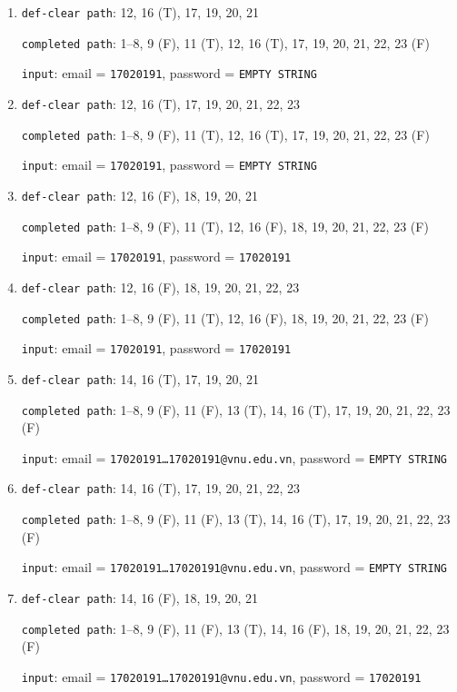 \documentclass{article}
\begin{document}
\begin{enumerate}
    \item \texttt{def-clear path}: 12, 16 (T), 17, 19, 20, 21
          \par \texttt{completed path}: 1--8, 9 (F), 11 (T), 12, 16 (T), 17, 19, 20, 21, 22, 23 (F)
          \par \texttt{input}: email = \texttt{17020191}, password = \texttt{EMPTY STRING}

    \item \texttt{def-clear path}: 12, 16 (T), 17, 19, 20, 21, 22, 23
          \par \texttt{completed path}: 1--8, 9 (F), 11 (T), 12, 16 (T), 17, 19, 20, 21, 22, 23 (F)
          \par \texttt{input}: email = \texttt{17020191}, password = \texttt{EMPTY STRING}

    \item \texttt{def-clear path}: 12, 16 (F), 18, 19, 20, 21
          \par \texttt{completed path}: 1--8, 9 (F), 11 (T), 12, 16 (F), 18, 19, 20, 21, 22, 23 (F)
          \par \texttt{input}: email = \texttt{17020191}, password = \texttt{17020191}

    \item \texttt{def-clear path}: 12, 16 (F), 18, 19, 20, 21, 22, 23
          \par \texttt{completed path}: 1--8, 9 (F), 11 (T), 12, 16 (F), 18, 19, 20, 21, 22, 23 (F)
          \par \texttt{input}: email = \texttt{17020191}, password = \texttt{17020191}

    \item \texttt{def-clear path}: 14, 16 (T), 17, 19, 20, 21
          \par \texttt{completed path}: 1--8, 9 (F), 11 (F), 13 (T), 14, 16 (T), 17, 19, 20, 21, 22, 23 (F)
          \par \texttt{input}: email = \texttt{17020191\ldots17020191@vnu.edu.vn}, password = \texttt{EMPTY STRING}

    \item \texttt{def-clear path}: 14, 16 (T), 17, 19, 20, 21, 22, 23
          \par \texttt{completed path}: 1--8, 9 (F), 11 (F), 13 (T), 14, 16 (T), 17, 19, 20, 21, 22, 23 (F)
          \par \texttt{input}: email = \texttt{17020191\ldots17020191@vnu.edu.vn}, password = \texttt{EMPTY STRING}

    \item \texttt{def-clear path}: 14, 16 (F), 18, 19, 20, 21
          \par \texttt{completed path}: 1--8, 9 (F), 11 (F), 13 (T), 14, 16 (F), 18, 19, 20, 21, 22, 23 (F)
          \par \texttt{input}: email = \texttt{17020191\ldots17020191@vnu.edu.vn}, password = \texttt{17020191}


\end{enumerate}
\end{document}
